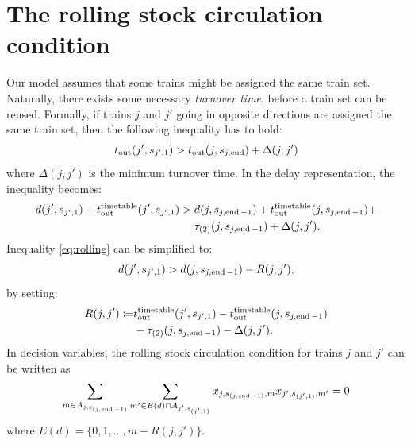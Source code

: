 \section{The rolling stock circulation condition}
Our model assumes that some trains might be assigned the same train set. Naturally,
there exists some necessary \emph{turnover time}, before a train set can be
reused. Formally, if trains $j$ and $j'$ going in opposite directions are
assigned the same train set, then the following inequality has to hold:
\begin{equation}
  t_\text{out}(j', s_{j',1}) > t_\text{out}(j, s_{j,\operatorname*{end}}) + \Delta(j, j')
\end{equation}
where $\Delta(j, j')$ is the minimum turnover time. In the delay
representation, the inequality becomes:
\begin{equation}
  \label{eq:rolling}
  \begin{split}
    d(j',s_{j',1}) + t_\text{out}^\text{timetable}(j',s_{j',1}) > & \; d(j, s_{j,\operatorname*{end}-1}) + t_\text{out}^\text{timetable}(j, s_{j,\operatorname*{end}-1}) + \\
    & \; \tau_{(2)}(j, s_{j,\operatorname*{end}-1}) + \Delta(j,j').
  \end{split}
\end{equation}
Inequality \eqref{eq:rolling} can be simplified to:
\begin{equation}
  d(j',s_{j',1}) > d(j, s_{j,\operatorname*{end}-1}) - R(j,j'),
\end{equation}
by setting:
\begin{equation}
  \label{eq:rolling2}
  \begin{split}
    R(j, j') \coloneq &t_\text{out}^\text{timetable}(j',s_{j',1}) - t_\text{out}^\text{timetable}(j, s_{j,\operatorname*{end}-1}) \\
    &- \tau_{(2)}(j,s_{j,\operatorname*{end}-1}) - \Delta(j,j').
  \end{split}
\end{equation}
In decision variables, the rolling stock circulation condition for trains $j$
and $j'$ can be written as
\begin{equation}
  \label{eq:qubo:rollingstock}
  \sum_{m \in A_{j, s_{(j, \operatorname*{end}-1)}}} \sum_{m' \in E(d) \cap A_{j',s_{(j',1)}}} x_{j,s_{(j,\operatorname*{end}-1)},m}x_{j', s_{(j',1)},m'} = 0
\end{equation}
where $E(d) = \{0, 1, \ldots, m-R(j, j')\}$.

